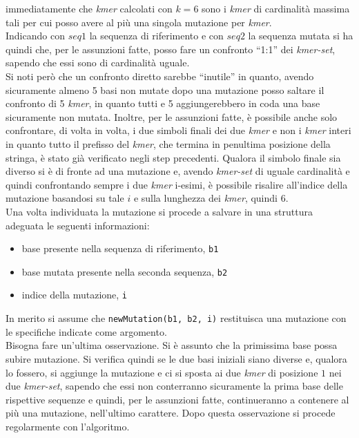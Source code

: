 \documentclass[a4paper,12pt, oneside]{book}
\begin{document}
immediatamente che \textit{kmer} calcolati con $k=6$ sono i \textit{kmer} di
cardinalità massima tali per cui posso avere al più una singola mutazione per
\textit{kmer}. \\
Indicando con $seq1$ la sequenza di riferimento e con $seq2$ la sequenza mutata
si ha quindi che, per le assunzioni fatte, posso fare un confronto ``1:1'' dei
\textit{kmer-set}, sapendo che essi sono di cardinalità uguale.\\
Si noti però che un confronto diretto sarebbe ``inutile'' in quanto, avendo
sicuramente almeno 5 basi non mutate dopo una mutazione posso saltare il
confronto di 5 \textit{kmer}, in quanto tutti e 5 aggiungerebbero in coda una
base sicuramente non mutata. Inoltre, per le assunzioni fatte, è possibile anche
solo confrontare, di volta in volta, i due simboli finali dei due \textit{kmer}
e non i \textit{kmer} interi in quanto tutto il prefisso del \textit{kmer}, che
termina in penultima posizione della stringa, è stato già verificato negli step
precedenti. Qualora il simbolo finale sia diverso si è di fronte ad una
mutazione e, avendo \textit{kmer-set} di uguale cardinalità e quindi
confrontando sempre i due \textit{kmer} i-esimi, è possibile risalire all'indice
della mutazione basandosi su tale $i$ e sulla lunghezza dei \textit{kmer},
quindi $6$.\\
Una volta individuata la mutazione si procede a salvare in una struttura
adeguata le seguenti informazioni:
\begin{itemize}
  \item base presente nella sequenza di riferimento, \texttt{b1}
  \item base mutata presente nella seconda sequenza, \texttt{b2}
  \item indice della mutazione, \texttt{i}
\end{itemize}
In merito si assume che \texttt{newMutation(b1, b2, i)} restituisca una
mutazione con le specifiche indicate come argomento.\\
Bisogna fare un'ultima osservazione. Si è assunto che la primissima base possa
subire mutazione. Si verifica quindi se le due basi iniziali siano diverse e,
qualora lo fossero, si aggiunge la mutazione e ci si sposta ai due \textit{kmer}
di posizione $1$ nei due \textit{kmer-set}, sapendo che essi non conterranno
sicuramente la prima base delle rispettive sequenze e quindi, per le assunzioni
fatte, continueranno a contenere al più una mutazione, nell'ultimo
carattere. Dopo questa osservazione 
si procede regolarmente con l'algoritmo.\\
\end{document}
